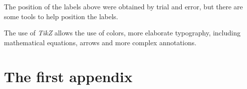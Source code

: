 \documentclass{book}
\begin{document}
The position of the labels above were obtained by trial and error, but
there are some tools to help position the labels.

The use of \emph{TikZ} allows the use of colors, more elaborate typography,
including mathematical equations, arrows and more complex annotations.

\appendix

\chapter{The first appendix}

\backmatter

\nocite{*}
\sloppy
\printbibliography

\printindex[not]
\printindex[aut]
\printindex[std]

\printnomenclature
\end{document}
